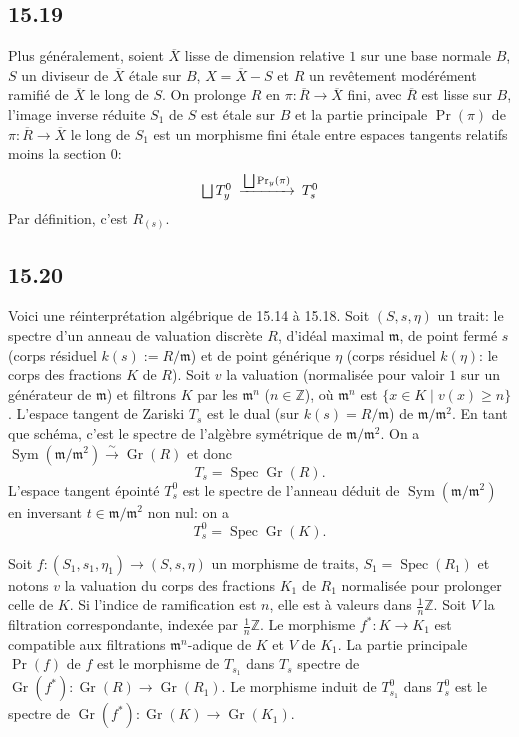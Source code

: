 \documentclass[12pt,a4paper]{article}
\theoremstyle{plain}
\theoremstyle{definition}
\theoremstyle{remark}
\DeclareMathOperator{\Spec}{Spec}
\DeclareMathOperator{\Gr}{Gr}
\DeclareMathOperator{\Sym}{Sym}
\newcommand{\bZ}{\mathbb{Z}}
\begin{document}
\subsection*{15.19}

Plus généralement, soient $\overline{X}$ lisse de dimension relative $1$ sur une base normale $B$, $S$ un diviseur de $\overline{X}$ étale sur $B$, $X = \overline{X} - S$ et $R$ un revêtement modérément ramifié de $\overline{X}$ le long de $S$. On prolonge $R$ en $\pi : \overline{R} \to \overline{X}$ fini, avec $\overline{R}$ est lisse sur $B$, l'image inverse réduite $S_1$ de $S$ est étale sur $B$ et la partie principale $\Pr(\pi)$ de $\pi : \overline{R} \to \overline{X}$ le long de $S_1$ est un morphisme fini étale entre espaces tangents relatifs moins la section $0$:
\[
\begin{CD}
\bigsqcup T_y^0 @>{\bigsqcup \Pr_y(\pi)}>> T_s^0
\end{CD}
\]
Par définition, c'est $R_{(s)}$.

\subsection*{15.20}

Voici une réinterprétation algébrique de 15.14 à 15.18. Soit $(S, s, \eta)$ un trait: le spectre d'un anneau de valuation discrète $R$, d'idéal maximal $\mathfrak{m}$, de point fermé $s$ (corps résiduel $k(s) := R/\mathfrak{m}$) et de point générique $\eta$ (corps résiduel $k(\eta)$: le corps des fractions $K$ de $R$). Soit $v$ la valuation (normalisée pour valoir $1$ sur un générateur de $\mathfrak{m}$) et filtrons $K$ par les $\mathfrak{m}^n$ ($n \in \bZ$), où $\mathfrak{m}^n$ est $\{x \in K \mid v(x) \geqslant n\}$. L'espace tangent de Zariski $T_s$ est le dual (sur $k(s) = R/\mathfrak{m}$) de $\mathfrak{m}/\mathfrak{m}^2$. En tant que schéma, c'est le spectre de l'algèbre symétrique de $\mathfrak{m}/\mathfrak{m}^2$. On a $\Sym(\mathfrak{m}/\mathfrak{m}^2) \xrightarrow{\sim} \Gr(R)$ et donc
\begin{equation}\label{eq:15.20.1}
T_s = \Spec \Gr(R).
\end{equation}
L'espace tangent épointé $T_s^0$ est le spectre de l'anneau déduit de $\Sym(\mathfrak{m}/\mathfrak{m}^2)$ en inversant $t \in \mathfrak{m}/\mathfrak{m}^2$ non nul: on a
\begin{equation}\label{eq:15.20.2}
T_s^0 = \Spec \Gr(K).
\end{equation}

Soit $f: (S_1, s_1, \eta_1) \to (S, s, \eta)$ un morphisme de traits, $S_1 = \Spec(R_1)$ et notons $v$ la valuation du corps des fractions $K_1$ de $R_1$ normalisée pour prolonger celle de $K$. Si l'indice de ramification est $n$, elle est à valeurs dans $\frac{1}{n}\bZ$. Soit $V$ la filtration correspondante, indexée par $\frac{1}{n}\bZ$. Le morphisme $f^*: K \to K_1$ est compatible aux filtrations $\mathfrak{m}^n$-adique de $K$ et $V$ de $K_1$. La partie principale $\Pr(f)$ de $f$ est le morphisme de $T_{s_1}$ dans $T_s$ spectre de $\Gr(f^*): \Gr(R) \to \Gr(R_1)$. Le morphisme induit de $T_{s_1}^0$ dans $T_s^0$ est le spectre de $\Gr(f^*): \Gr(K) \to \Gr(K_1)$.
\end{document}
